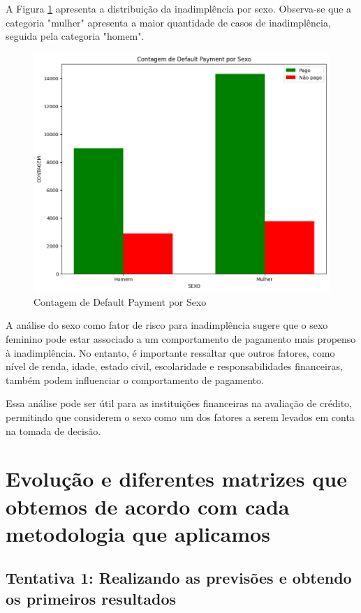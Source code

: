\documentclass{abntpuc}
\begin{document}
A Figura \ref{fig:grafico4} apresenta a distribuição da inadimplência por sexo. Observa-se que a categoria "mulher" apresenta a maior quantidade de casos de inadimplência, seguida pela categoria "homem".

\begin{figure}[H]
    \centering
    \includegraphics[width=\textwidth]{grafico4.png}
    \caption{Contagem de Default Payment por Sexo}
    \label{fig:grafico4}
\end{figure}

A análise do sexo como fator de risco para inadimplência sugere que o sexo feminino pode estar associado a um comportamento de pagamento mais propenso à inadimplência. No entanto, é importante ressaltar que outros fatores, como nível de renda, idade, estado civil, escolaridade e responsabilidades financeiras, também podem influenciar o comportamento de pagamento.

Essa análise pode ser útil para as instituições financeiras na avaliação de crédito, permitindo que considerem o sexo como um dos fatores a serem levados em conta na tomada de decisão.

\chapter{Evolução e diferentes matrizes que obtemos de acordo com cada metodologia que aplicamos}

\section{Tentativa 1: Realizando as previsões e obtendo os primeiros resultados}
\end{document}
